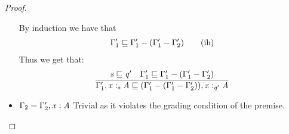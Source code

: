 \begin{proof}
\begin{itemize}
By induction we have that
%
\begin{align*}
\Gamma'_{{\mathrm{1}}} \sqsubseteq \Gamma'_{{\mathrm{1}}}  -  (  \Gamma'_{{\mathrm{1}}}  -  \Gamma'_{{\mathrm{2}}}  ) \tag{ih}
\end{align*}
%
%
Thus we get that:
%
\begin{align*}
\dfrac{\GRANULEnt{s} \sqsubseteq \GRANULEnt{q'} \quad
\Gamma'_{{\mathrm{1}}} \sqsubseteq \Gamma'_{{\mathrm{1}}}  \GRANULEsym{-}  \GRANULEsym{(}  \Gamma'_{{\mathrm{1}}}  \GRANULEsym{-}  \Gamma'_{{\mathrm{2}}}  \GRANULEsym{)}}
{ \Gamma'_{{\mathrm{1}}}  \GRANULEsym{,}   \GRANULEmv{x}  :_{\textcolor{coeffectColor}{  \GRANULEnt{s}  } }   \GRANULEnt{A} \sqsubseteq \GRANULEsym{(}  \Gamma'_{{\mathrm{1}}}  \GRANULEsym{-}  \GRANULEsym{(}  \Gamma'_{{\mathrm{1}}}  \GRANULEsym{-}  \Gamma'_{{\mathrm{2}}}  \GRANULEsym{)}  \GRANULEsym{)}  \GRANULEsym{,}   \GRANULEmv{x}  :_{\textcolor{coeffectColor}{  \GRANULEnt{q'}  } }   \GRANULEnt{A} }
\end{align*}
%
\item $\Gamma_{{\mathrm{2}}} = \Gamma'_{{\mathrm{2}}}  ,   \mathit{x}  :  \mathit{A}$ Trivial as it violates the grading
  condition of the premise.
\end{itemize}
\end{proof}

\subSynthSound*

